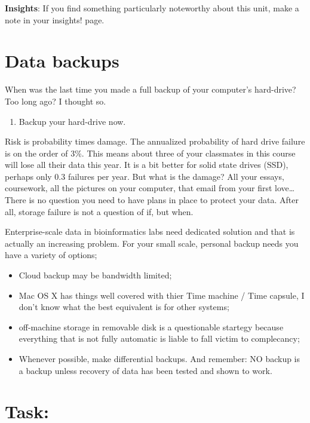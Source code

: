 \documentclass[]{book}
\providecommand{\tightlist}{%
  \setlength{\itemsep}{0pt}\setlength{\parskip}{0pt}}
\begin{document}
\textbf{Insights}: If you find something particularly noteworthy about
this unit, make a note in your insights! page.

\section{Data backups}\label{data-backups}

When was the last time you made a full backup of your computer's
hard-drive? Too long ago? I thought so.

\begin{rmd-task}
\begin{enumerate}
\def\labelenumi{\arabic{enumi}.}
\tightlist
\item
  Backup your hard-drive now.
\end{enumerate}
\end{rmd-task}

Risk is probability times damage. The annualized probability of hard
drive failure is on the order of 3\%. This means about three of your
classmates in this course will lose all their data this year. It is a
bit better for solid state drives (SSD), perhaps only 0.3 failures per
year. But what is the damage? All your essays, coursework, all the
pictures on your computer, that email from your first love\ldots{} There
is no question you need to have plans in place to protect your data.
After all, storage failure is not a question of if, but when.

Enterprise-scale data in bioinformatics labs need dedicated solution and
that is actually an increasing problem. For your small scale, personal
backup needs you have a variety of options;

\begin{itemize}
\tightlist
\item
  Cloud backup may be bandwidth limited;
\item
  Mac OS X has things well covered with thier Time machine / Time
  capsule, I don't know what the best equivalent is for other systems;
\item
  off-machine storage in removable disk is a questionable startegy
  because everything that is not fully automatic is liable to fall
  victim to complecancy;
\item
  Whenever possible, make differential backups. And remember: NO backup
  is a backup unless recovery of data has been tested and shown to work.
\end{itemize}

\section{Task:}\label{task-3}
\end{document}
